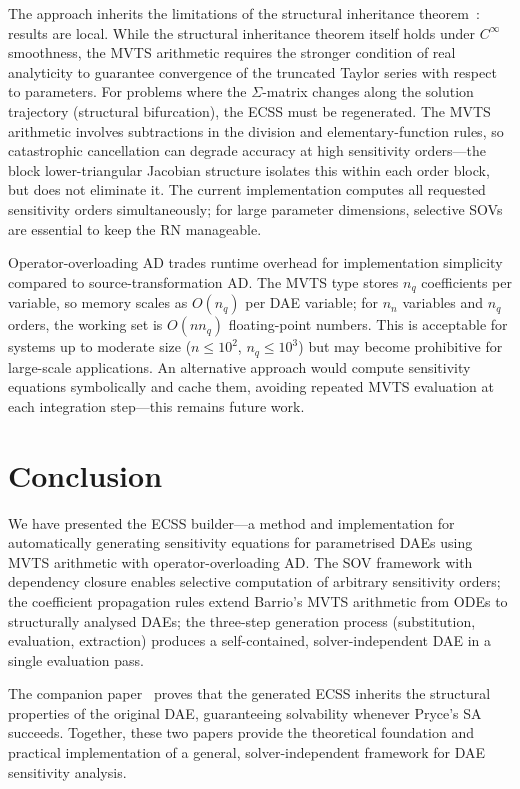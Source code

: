 \documentclass[12pt,a4paper]{article}
\theoremstyle{definition}
\theoremstyle{plain}
\theoremstyle{remark}
\begin{document}
The approach inherits the limitations of the structural inheritance theorem~\cite{cao2026structural}: results are local. While the structural inheritance theorem itself holds under $C^\infty$ smoothness, the MVTS arithmetic requires the stronger condition of real analyticity to guarantee convergence of the truncated Taylor series with respect to parameters. For problems where the $\Sigma$-matrix changes along the solution trajectory (structural bifurcation), the ECSS must be regenerated. The MVTS arithmetic involves subtractions in the division and elementary-function rules, so catastrophic cancellation can degrade accuracy at high sensitivity orders---the block lower-triangular Jacobian structure isolates this within each order block, but does not eliminate it. The current implementation computes all requested sensitivity orders simultaneously; for large parameter dimensions, selective SOVs are essential to keep the RN manageable.

Operator-overloading AD trades runtime overhead for implementation simplicity compared to source-transformation AD. The MVTS type stores $n_q$ coefficients per variable, so memory scales as $O(n_q)$ per DAE variable; for $n_n$ variables and $n_q$ orders, the working set is $O(n n_q)$ floating-point numbers. This is acceptable for systems up to moderate size ($n\le 10^2$, $n_q\le 10^3$) but may become prohibitive for large-scale applications. An alternative approach would compute sensitivity equations symbolically and cache them, avoiding repeated MVTS evaluation at each integration step---this remains future work.

\section{Conclusion}

We have presented the ECSS builder---a method and implementation for automatically generating sensitivity equations for parametrised DAEs using MVTS arithmetic with operator-overloading AD. The SOV framework with dependency closure enables selective computation of arbitrary sensitivity orders; the coefficient propagation rules extend Barrio's MVTS arithmetic from ODEs to structurally analysed DAEs; the three-step generation process (substitution, evaluation, extraction) produces a self-contained, solver-independent DAE in a single evaluation pass.

The companion paper~\cite{cao2026structural} proves that the generated ECSS inherits the structural properties of the original DAE, guaranteeing solvability whenever Pryce's SA succeeds. Together, these two papers provide the theoretical foundation and practical implementation of a general, solver-independent framework for DAE sensitivity analysis.
\end{document}
